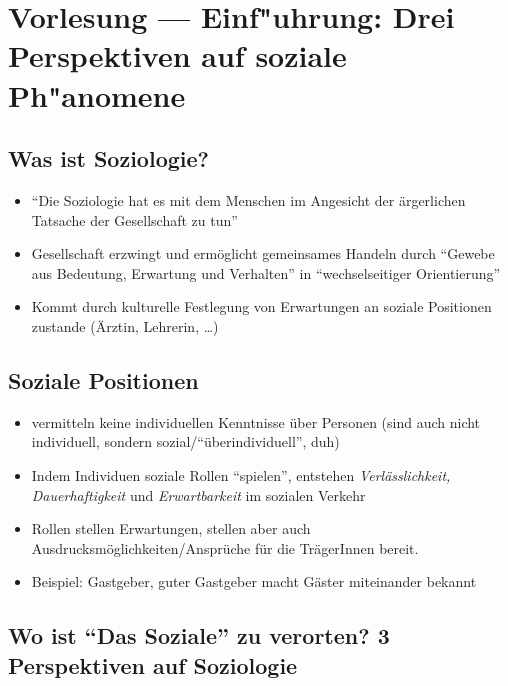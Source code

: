 
\section{Vorlesung  --- Einf"uhrung: Drei Perspektiven auf soziale Ph"anomene}
\subsection{Was ist Soziologie?}
\begin{itemize}
	\item
\enquote{Die Soziologie hat es mit dem Menschen im Angesicht der ärgerlichen Tatsache der Gesellschaft zu tun}
\item
	Gesellschaft erzwingt und ermöglicht gemeinsames Handeln durch \enquote{Gewebe aus Bedeutung, Erwartung und Verhalten} in \enquote{wechselseitiger Orientierung}
\item
	Kommt durch kulturelle Festlegung von Erwartungen an soziale Positionen zustande (Ärztin, Lehrerin, \dots)
\end{itemize}
\subsection{Soziale Positionen}
\begin{itemize}
	\item
		vermitteln keine individuellen Kenntnisse über Personen (sind auch nicht individuell, sondern sozial/\enquote{überindividuell}, duh)
	\item
		Indem Individuen soziale Rollen \enquote{spielen}, entstehen \textit{Verlässlichkeit, Dauerhaftigkeit} und \textit{Erwartbarkeit} im sozialen Verkehr
	\item
		Rollen stellen Erwartungen, stellen aber auch Ausdrucksmöglichkeiten/Ansprüche für die TrägerInnen bereit.
	\item
		Beispiel: Gastgeber, guter Gastgeber macht Gäster miteinander bekannt
\end{itemize}

\subsection{Wo ist \enquote{Das Soziale} zu verorten? 3 Perspektiven auf Soziologie}

